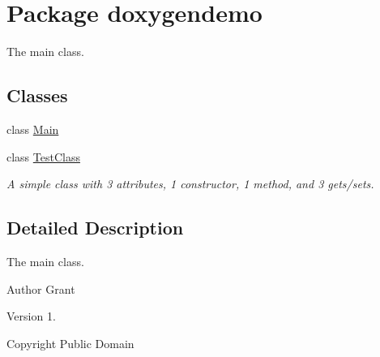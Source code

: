 \hypertarget{namespacedoxygendemo}{}\section{Package doxygendemo}
\label{namespacedoxygendemo}


The main class.  


\subsection*{Classes}
\begin{DoxyCompactItemize}
\item 
class \hyperlink{classdoxygendemo_1_1_main}{Main}
\item 
class \hyperlink{classdoxygendemo_1_1_test_class}{Test\+Class}
\begin{DoxyCompactList}\small\item\em A simple class with 3 attributes, 1 constructor, 1 method, and 3 gets/sets. \end{DoxyCompactList}\end{DoxyCompactItemize}


\subsection{Detailed Description}
The main class. 

\begin{DoxyAuthor}{Author}
Grant 
\end{DoxyAuthor}
\begin{DoxyVersion}{Version}
1. 
\end{DoxyVersion}
\begin{DoxyCopyright}{Copyright}
Public Domain 
\end{DoxyCopyright}
